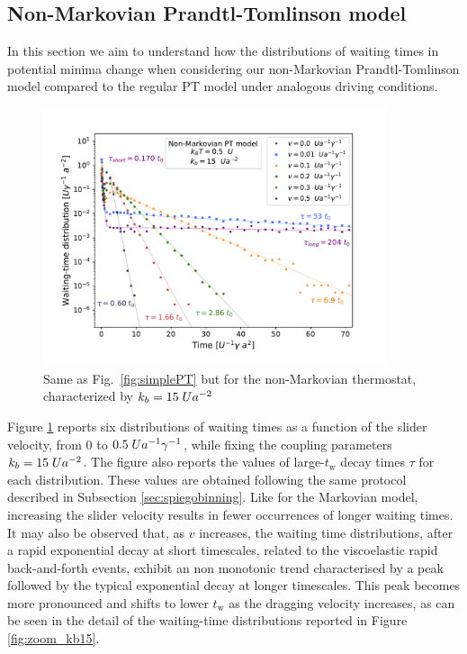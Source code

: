 \subsection{Non-Markovian Prandtl-Tomlinson model}
In this section we aim to understand how the distributions of waiting times in potential minima change when considering our non-Markovian Prandtl-Tomlinson model compared to the regular PT model under analogous driving conditions.
\begin{figure}
    \centering
    \includegraphics[width=0.9\textwidth]{istogramma_confronto_kb15_def.pdf}
    \caption{Same as Fig.~\ref{fig:simplePT} but for the non-Markovian thermostat, characterized by $k_b=15\hspace{0.1cm}Ua^{-2}$}
    \label{fig:confronto_velocità_kb15}
\end{figure}
Figure \ref{fig:confronto_velocità_kb15} reports six distributions of waiting times as a function of the slider velocity, from $0$ to $0.5 \hspace{0.1cm} U a^{-1} \gamma^{-1}$, while fixing the coupling parameters $k_b=15\hspace{0.1cm}Ua^{-2}$. The figure also reports the values of large-$t_\text{w}$ decay times $\tau$ for each distribution. These values are obtained following the same protocol described in Subsection \ref{sec:spiegobinning}. Like for the Markovian model, increasing the slider velocity results in fewer occurrences of longer waiting times. It may also be observed that, as $v$ increases, the waiting time distributions, after a rapid exponential decay at short timescales, related to the viscoelastic rapid back-and-forth events, exhibit an non monotonic trend characterised by a peak followed by the typical exponential decay at longer timescales. This peak becomes more pronounced and shifts to lower $t_\text{w}$ as the dragging velocity increases, as can be seen in the detail of the waiting-time distributions reported in Figure \ref{fig:zoom_kb15}.
